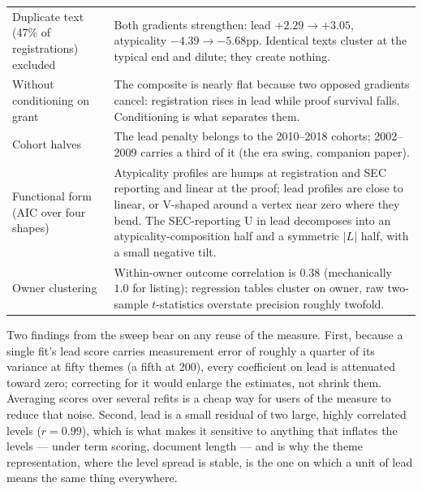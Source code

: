 \begin{table}[!htbp]
\begin{tabular}{p{5.6cm}p{7.6cm}}
Duplicate text (47\% of registrations) excluded & Both gradients strengthen: lead $+2.29 \to +3.05$, atypicality $-4.39 \to -5.68$pp. Identical texts cluster at the typical end and dilute; they create nothing. \\
Without conditioning on grant & The composite is nearly flat because two opposed gradients cancel: registration rises in lead while proof survival falls. Conditioning is what separates them. \\
Cohort halves & The lead penalty belongs to the 2010--2018 cohorts; 2002--2009 carries a third of it (the era swing, companion paper). \\
Functional form (AIC over four shapes) & Atypicality profiles are humps at registration and SEC reporting and linear at the proof; lead profiles are close to linear, or V-shaped around a vertex near zero where they bend. The SEC-reporting U in lead decomposes into an atypicality-composition half and a symmetric $|L|$ half, with a small negative tilt. \\
Owner clustering & Within-owner outcome correlation is $0.38$ (mechanically $1.0$ for listing); regression tables cluster on owner, raw two-sample $t$-statistics overstate precision roughly twofold. \\
\bottomrule
\end{tabular}
\end{table}

Two findings from the sweep bear on any reuse of the measure. First,
because a single fit's lead score carries measurement error of roughly a
quarter of its variance at fifty themes (a fifth at 200), every
coefficient on lead is attenuated toward zero; correcting for it would
enlarge the estimates, not shrink them. Averaging scores over several
refits is a cheap way for users of the measure to reduce that noise.
Second, lead is a small residual of two large, highly correlated levels
($r = 0.99$), which is what makes it sensitive to anything that
inflates the levels --- under term scoring, document length --- and is
why the theme representation, where the level spread is stable, is the
one on which a unit of lead means the same thing everywhere.
